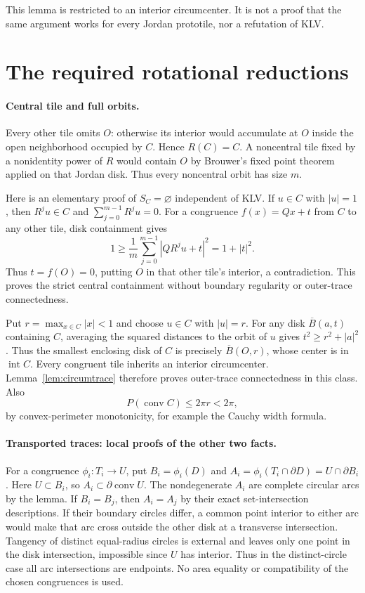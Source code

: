 \documentclass[11pt]{article}
\newcommand{\interior}{\operatorname{int}}
\newcommand{\conv}{\operatorname{conv}}
\begin{document}
This lemma is restricted to an interior circumcenter. It is not a proof that
the same argument works for every Jordan prototile, nor a refutation of KLV.

\section{The required rotational reductions}

\paragraph{Central tile and full orbits.}
Every other tile omits $O$: otherwise its interior would accumulate at $O$
inside the open neighborhood occupied by $C$. Hence $R(C)=C$. A noncentral
tile fixed by a nonidentity power of $R$ would contain $O$ by Brouwer's fixed
point theorem applied on that Jordan disk. Thus every noncentral orbit has
size $m$.

Here is an elementary proof of $S_C=\varnothing$ independent of KLV.
If $u\in C$ with $|u|=1$, then $R^ju\in C$ and
$\sum_{j=0}^{m-1}R^ju=0$. For a congruence $f(x)=Qx+t$ from $C$ to any
other tile, disk containment gives
\[
 1\geq\frac1m\sum_{j=0}^{m-1}|QR^ju+t|^2=1+|t|^2.
\]
Thus $t=f(O)=0$, putting $O$ in that other tile's interior, a contradiction.
This proves the strict central containment without boundary regularity or
outer-trace connectedness.

Put $r=\max_{x\in C}|x|<1$ and choose $u\in C$ with $|u|=r$. For any
disk $\overline B(a,t)$ containing $C$, averaging the squared distances to
the orbit of $u$ gives $t^2\geq r^2+|a|^2$. Thus the smallest enclosing
disk of $C$ is precisely $\overline B(O,r)$, whose center is in
$\interior C$. Every congruent tile inherits an interior circumcenter.
Lemma~\ref{lem:circumtrace} therefore proves outer-trace connectedness in
this class. Also
\[
 P(\conv C)\leq2\pi r<2\pi,
\]
by convex-perimeter monotonicity, for example the Cauchy width formula.

\paragraph{Transported traces: local proofs of the other two facts.}
For a congruence $\phi_i:T_i\to U$, put $B_i=\phi_i(D)$ and
$A_i=\phi_i(T_i\cap\partial D)=U\cap\partial B_i$.
Here $U\subset B_i$, so $A_i\subset\partial\conv U$.
The nondegenerate $A_i$ are complete circular arcs by the lemma.
If $B_i=B_j$, then $A_i=A_j$ by their exact set-intersection descriptions.
If their boundary circles differ, a common point interior to either arc
would make that arc cross outside the other disk at a transverse intersection.
Tangency of distinct equal-radius circles is external and leaves only one
point in the disk intersection, impossible since $U$ has interior.
Thus in the distinct-circle case all arc intersections are endpoints.
No area equality or compatibility of the chosen congruences is used.
\end{document}
